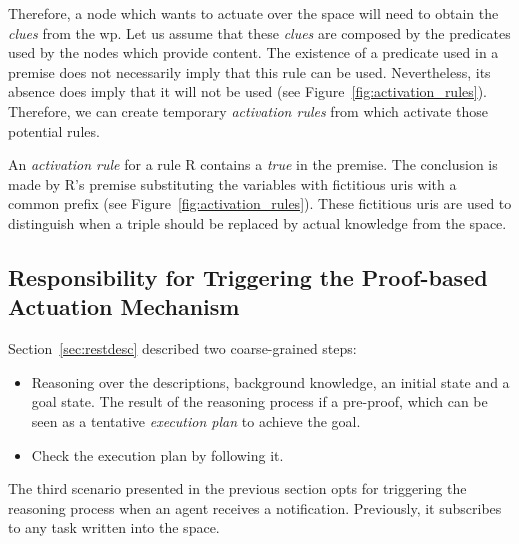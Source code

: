 Therefore, a node which wants to actuate over the space will need to obtain the \emph{clues} from the \ac{wp}.
Let us assume that these \emph{clues} are composed by the predicates used by the nodes which provide content. %
The existence of a predicate used in a premise does not necessarily imply that this rule can be used.
Nevertheless, its absence does imply that it will not be used (see Figure~\ref{fig:activation_rules}).
Therefore, we can create temporary \emph{activation rules} from \clues{} which activate those potential rules. %




An \emph{activation rule} for a rule R contains a \emph{true} in the premise.
The conclusion is made by R's premise substituting the variables with fictitious \acsp{uri} with a common prefix (see Figure~\ref{fig:activation_rules}).
These fictitious \acsp{uri} are used to distinguish when a triple should be replaced by actual knowledge from the space. %



\subsection{Responsibility for Triggering the Proof-based Actuation Mechanism}
\label{sec:responsible_proof}

Section~\ref{sec:restdesc} described two coarse-grained steps:
\begin{itemize}
  \item Reasoning over the descriptions, background knowledge, an initial state and a goal state.
        The result of the reasoning process if a pre-proof, which can be seen as a tentative \emph{execution plan} to achieve the goal.
  \item Check the execution plan by following it.
\end{itemize}


The third scenario presented in the previous section opts for triggering the reasoning process when an agent receives a notification.
Previously, it subscribes to any task written into the space.


